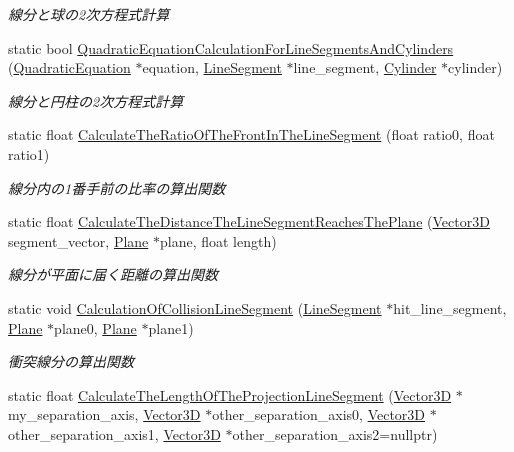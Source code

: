 \begin{DoxyCompactItemize}
\begin{DoxyCompactList}\small\item\em 線分と球の2次方程式計算 \end{DoxyCompactList}\item 
static bool \mbox{\hyperlink{class_collision_calculation_a860cb4de288c1dbd5e21698b9f9a43d7}{Quadratic\+Equation\+Calculation\+For\+Line\+Segments\+And\+Cylinders}} (\mbox{\hyperlink{class_quadratic_equation}{Quadratic\+Equation}} $\ast$equation, \mbox{\hyperlink{class_line_segment}{Line\+Segment}} $\ast$line\+\_\+segment, \mbox{\hyperlink{class_cylinder}{Cylinder}} $\ast$cylinder)
\begin{DoxyCompactList}\small\item\em 線分と円柱の2次方程式計算 \end{DoxyCompactList}\item 
static float \mbox{\hyperlink{class_collision_calculation_a59459a11f5f025b10e81d7ba52772809}{Calculate\+The\+Ratio\+Of\+The\+Front\+In\+The\+Line\+Segment}} (float ratio0, float ratio1)
\begin{DoxyCompactList}\small\item\em 線分内の1番手前の比率の算出関数 \end{DoxyCompactList}\item 
static float \mbox{\hyperlink{class_collision_calculation_a562488bfcc7d29102790b957acf71c90}{Calculate\+The\+Distance\+The\+Line\+Segment\+Reaches\+The\+Plane}} (\mbox{\hyperlink{class_vector3_d}{Vector3D}} segment\+\_\+vector, \mbox{\hyperlink{class_plane}{Plane}} $\ast$plane, float length)
\begin{DoxyCompactList}\small\item\em 線分が平面に届く距離の算出関数 \end{DoxyCompactList}\item 
static void \mbox{\hyperlink{class_collision_calculation_a10997575baef11490c120f8306a270ae}{Calculation\+Of\+Collision\+Line\+Segment}} (\mbox{\hyperlink{class_line_segment}{Line\+Segment}} $\ast$hit\+\_\+line\+\_\+segment, \mbox{\hyperlink{class_plane}{Plane}} $\ast$plane0, \mbox{\hyperlink{class_plane}{Plane}} $\ast$plane1)
\begin{DoxyCompactList}\small\item\em 衝突線分の算出関数 \end{DoxyCompactList}\item 
static float \mbox{\hyperlink{class_collision_calculation_a7edbbf64d99efd6988925037ee0827af}{Calculate\+The\+Length\+Of\+The\+Projection\+Line\+Segment}} (\mbox{\hyperlink{class_vector3_d}{Vector3D}} $\ast$my\+\_\+separation\+\_\+axis, \mbox{\hyperlink{class_vector3_d}{Vector3D}} $\ast$other\+\_\+separation\+\_\+axis0, \mbox{\hyperlink{class_vector3_d}{Vector3D}} $\ast$other\+\_\+separation\+\_\+axis1, \mbox{\hyperlink{class_vector3_d}{Vector3D}} $\ast$other\+\_\+separation\+\_\+axis2=nullptr)

\end{DoxyCompactItemize}
